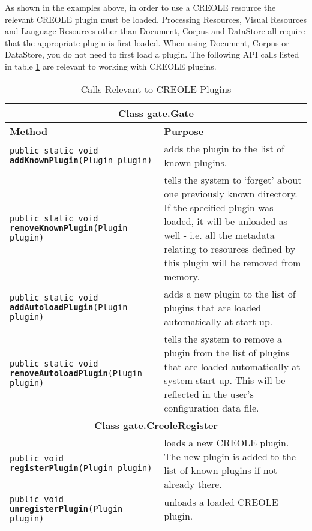 
As shown in the examples above, in order to use a CREOLE resource the relevant
CREOLE plugin must be loaded. Processing Resources, Visual Resources and
Language Resources other than Document, Corpus and DataStore all require that the
appropriate plugin is first loaded. When using Document, Corpus or DataStore, you
do not need to first load a plugin. The following API calls listed in table
\ref{table:creole-calls} are relevant to working with CREOLE plugins.


\begin{table}[htbp]
\begin{small}
\begin{center}
\begin{tabular}{|p{}|p{}|}
\hline
\multicolumn{2}{|c|}{\textbf{Class \underline{gate.Gate}}}\\
\hline
\hline
\textbf{Method} & \textbf{Purpose}\\
\hline
{\tt public static void {\bf addKnownPlugin}(Plugin plugin)} & adds the plugin
to the list of known plugins.\\
\hline
{\tt public static void {\bf removeKnownPlugin}(Plugin plugin)} & tells the
system to `forget' about one previously known directory. If the specified plugin 
was loaded, it will be unloaded as well - i.e. all the metadata relating to 
resources defined by this plugin will be removed from memory.\\
\hline
{\tt public static void {\bf addAutoloadPlugin}(Plugin plugin)} & adds a new 
plugin to the list of plugins that are loaded automatically at start-up.\\
\hline
{\tt public static void {\bf removeAutoloadPlugin}(Plugin plugin)} & tells the 
system to remove a plugin from the list of plugins that are loaded 
automatically at system start-up. This will be reflected in the user's 
configuration data file.\\
\hline
\multicolumn{2}{|c|}{\textbf{Class \underline{gate.CreoleRegister}}}\\
\hline
\hline
{\tt public void {\bf registerPlugin}(Plugin plugin)} & loads a new
CREOLE plugin. The new plugin is added to the list of known plugins if not already
there.\\
\hline
{\tt public void {\bf unregisterPlugin}(Plugin plugin)} & unloads a loaded CREOLE
plugin.\\
\hline
\end{tabular}
\caption{Calls Relevant to CREOLE Plugins}
\label{table:creole-calls}
\end{center}
\end{small}
\end{table}

